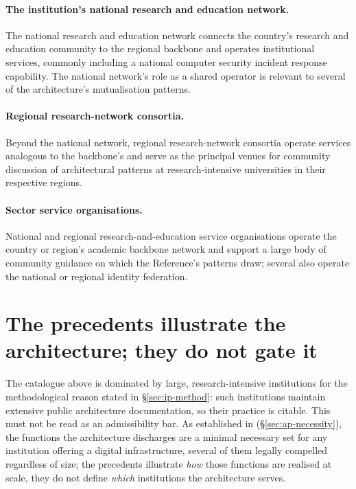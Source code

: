 \paragraph{The institution's national research and education
network.} The national research and education network connects
the country's research and education community to the regional
backbone and operates institutional services, commonly including
a national computer security incident response capability. The
national network's role as a shared operator is relevant to
several of the architecture's mutualisation patterns.

\paragraph{Regional research-network consortia.} Beyond the
national network, regional research-network consortia operate
services analogous to the backbone's and serve as the principal
venues for community discussion of architectural patterns at
research-intensive universities in their respective regions.

\paragraph{Sector service organisations.} National and regional
research-and-education service organisations operate the country
or region's academic backbone network and support a large body of
community guidance on which the Reference's patterns draw; several
also operate the national or regional identity federation.

\section{The precedents illustrate the architecture; they do not gate it}
\label{sec:ip-beyond-flagship}

The catalogue above is dominated by large, research-intensive
institutions for the methodological reason stated in
\S\ref{sec:ip-method}: such institutions maintain extensive public
architecture documentation, so their practice is citable. This must
not be read as an admissibility bar. As established in
 (\S\ref{sec:ap-necessity}), the
functions the architecture discharges are a minimal necessary set for
any institution offering a digital infrastructure, several of them
legally compelled regardless of size; the precedents illustrate
\emph{how} those functions are realised at scale, they do not define
\emph{which} institutions the architecture serves.

